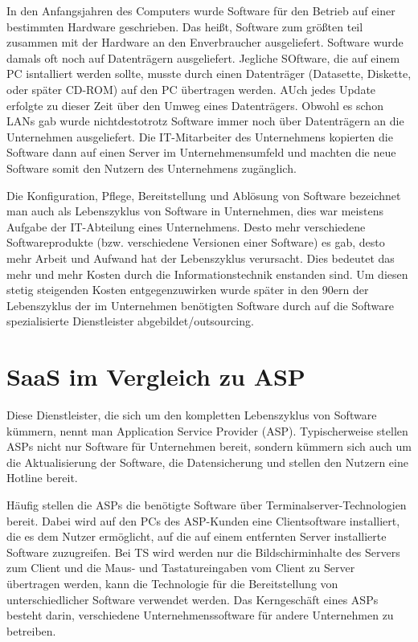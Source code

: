 \documentclass[a4paper,10pt]{article}
\begin{document}
\vspace{3mm}

In den Anfangsjahren des Computers wurde Software für den Betrieb auf einer bestimmten Hardware geschrieben. Das heißt, Software zum größten teil zusammen mit der Hardware an den Enverbraucher ausgeliefert. Software wurde damals oft noch auf Datenträgern ausgeliefert. Jegliche SOftware, die auf einem PC isntalliert werden sollte, musste durch einen Datenträger (Datasette, Diskette, oder später CD-ROM) auf den PC übertragen werden. AUch jedes Update erfolgte zu dieser Zeit über den Umweg eines Datenträgers. Obwohl es schon LANs gab wurde nichtdestotrotz Software immer noch über Datenträgern an die Unternehmen ausgeliefert. Die IT-Mitarbeiter des Unternehmens kopierten die Software dann auf einen Server im Unternehmensumfeld und machten die neue Software somit den Nutzern des Unternehmens zugänglich.


\vspace{3mm}
Die Konfiguration, Pflege, Bereitstellung und Ablösung von Software bezeichnet man auch als Lebenszyklus von Software in Unternehmen, dies war meistens Aufgabe der IT-Abteilung eines Unternehmens. Desto mehr verschiedene Softwareprodukte (bzw. verschiedene Versionen einer Software) es gab, desto mehr Arbeit und Aufwand hat der Lebenszyklus verursacht. Dies bedeutet das mehr und mehr Kosten durch die Informationstechnik enstanden sind. Um diesen stetig steigenden Kosten entgegenzuwirken wurde später in den 90ern der Lebenszyklus der im Unternehmen benötigten Software durch auf die Software spezialisierte Dienstleister abgebildet/outsourcing.

\section{SaaS im Vergleich zu ASP}
Diese Dienstleister, die sich um den kompletten Lebenszyklus von Software kümmern, nennt man Application Service Provider (ASP). Typischerweise stellen ASPs nicht nur Software für Unternehmen bereit, sondern kümmern sich auch um die Aktualisierung der Software, die Datensicherung und stellen den Nutzern eine Hotline bereit.


\vspace{3mm}
Häufig stellen die ASPs die benötigte Software über Terminalserver-Technologien bereit. Dabei wird auf den PCs des ASP-Kunden eine Clientsoftware installiert, die es dem Nutzer ermöglicht, auf die auf einem entfernten Server installierte Software zuzugreifen. Bei TS wird werden nur die Bildschirminhalte des Servers zum Client und die Maus- und Tastatureingaben vom Client zu Server übertragen werden, kann die Technologie für die Bereitstellung von unterschiedlicher Software verwendet werden. Das Kerngeschäft eines ASPs besteht darin, verschiedene Unternehmenssoftware für andere Unternehmen zu betreiben.
\end{document}
